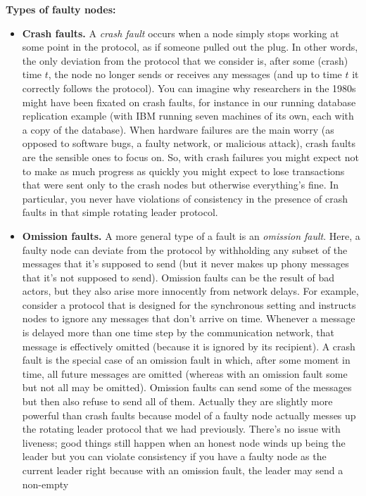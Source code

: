 \noindent
\textbf{Types of faulty nodes:}
\begin{itemize}
    \item \textbf{Crash faults.} A \textit{crash fault} occurs when a node simply stops working at some point in
the protocol, as if someone pulled out the plug. In other words, the only deviation from the
protocol that we consider is, after some (crash) time $t$, the node no longer sends or receives
any messages (and up to time $t$ it correctly follows the protocol).
You can imagine why researchers in the 1980s might have been fixated on crash faults,
for instance in our running database replication example (with IBM running seven machines
of its own, each with a copy of the database). When hardware failures are the main worry
(as opposed to software bugs, a faulty network, or malicious attack), crash faults are the
sensible ones to focus on. So, with crash failures you might expect not to make as much
progress as quickly you might expect to lose transactions that were sent only to the crash nodes but
otherwise everything's fine. In particular, you never have violations of consistency in the presence of crash faults in that simple rotating leader protocol.
    \item \textbf{Omission faults.} A more general type of a fault is an \textit{omission fault}. Here, a faulty node
can deviate from the protocol by withholding any subset of the messages that it’s supposed
to send (but it never makes up phony messages that it’s not supposed to send). Omission
faults can be the result of bad actors, but they also arise more innocently from network
delays. For example, consider a protocol that is designed for the synchronous setting and
instructs nodes to ignore any messages that don’t arrive on time. Whenever a message is
delayed more than one time step by the communication network, that message is effectively
omitted (because it is ignored by its recipient). A crash fault is the special case of an omission
fault in which, after some moment in time, all future messages are omitted (whereas with
an omission fault some but not all may be omitted). 
Omission faults can send some of the messages but then also refuse to send all of them. Actually they are slightly more powerful than crash faults
because model of a faulty node actually messes up the rotating leader protocol that we had 
previously. There's no issue with liveness; good things still happen when an
honest node winds up being the leader but you can violate consistency
if you have a faulty node as the current leader right because with an omission fault, the leader may send a non-empty

\end{itemize}
